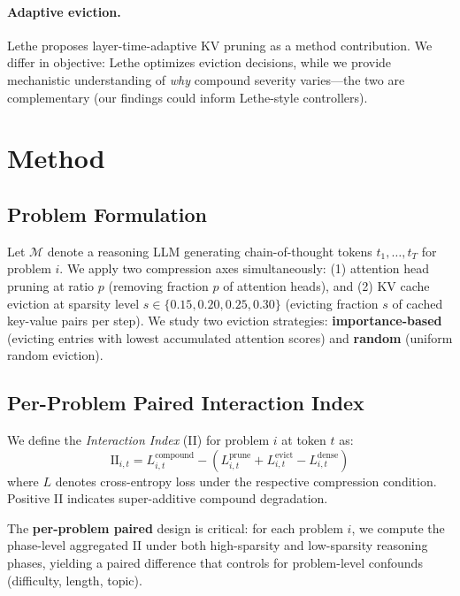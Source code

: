 \documentclass[11pt,a4paper]{article}
\begin{document}
\paragraph{Adaptive eviction.} Lethe \cite{lethe2026} proposes layer-time-adaptive KV pruning as a method contribution. We differ in objective: Lethe optimizes eviction decisions, while we provide mechanistic understanding of \emph{why} compound severity varies---the two are complementary (our findings could inform Lethe-style controllers).

\section{Method}

\subsection{Problem Formulation}

Let $\mathcal{M}$ denote a reasoning LLM generating chain-of-thought tokens $t_1, \ldots, t_T$ for problem $i$. We apply two compression axes simultaneously: (1) attention head pruning at ratio $p$ (removing fraction $p$ of attention heads), and (2) KV cache eviction at sparsity level $s \in \{0.15, 0.20, 0.25, 0.30\}$ (evicting fraction $s$ of cached key-value pairs per step). We study two eviction strategies: \textbf{importance-based} (evicting entries with lowest accumulated attention scores) and \textbf{random} (uniform random eviction).

\subsection{Per-Problem Paired Interaction Index}

We define the \emph{Interaction Index} (II) for problem $i$ at token $t$ as:
\begin{equation}
\text{II}_{i,t} = L_{i,t}^{\text{compound}} - (L_{i,t}^{\text{prune}} + L_{i,t}^{\text{evict}} - L_{i,t}^{\text{dense}})
\end{equation}
where $L$ denotes cross-entropy loss under the respective compression condition. Positive II indicates super-additive compound degradation.

The \textbf{per-problem paired} design is critical: for each problem $i$, we compute the phase-level aggregated II under both high-sparsity and low-sparsity reasoning phases, yielding a paired difference that controls for problem-level confounds (difficulty, length, topic).
\end{document}
